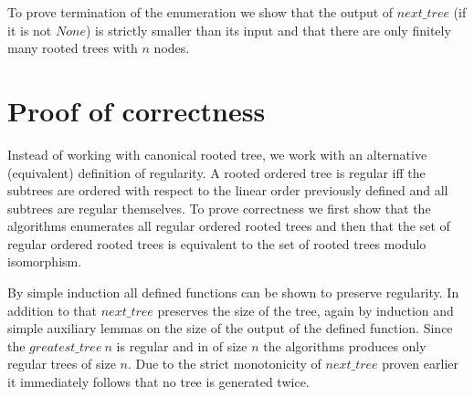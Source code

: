 To prove termination of the enumeration we show that the output of $next\_tree$ (if it is not $None$) is strictly smaller than its input and that there are only finitely many rooted trees with $n$ nodes.

\section{Proof of correctness}

Instead of working with canonical rooted tree, we work with an alternative (equivalent) definition of regularity.
A rooted ordered tree is regular iff the subtrees are ordered with respect to the linear order previously defined and all subtrees are regular themselves.
To prove correctness we first show that the algorithms enumerates all regular ordered rooted trees and then that the set of regular ordered rooted trees is equivalent to the set of rooted trees modulo isomorphism.

By simple induction all defined functions can be shown to preserve regularity. In addition to that $next\_tree$ preserves the size of the tree, again by induction and simple auxiliary lemmas on the size of the output of the defined function.
Since the $greatest\_tree\ n$ is regular and in of size $n$ the algorithms produces only regular trees of size $n$.
Due to the strict monotonicity of $next\_tree$ proven earlier it immediately follows that no tree is generated twice.

